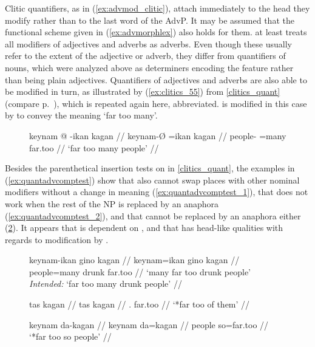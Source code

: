 Clitic quantifiers, as in (\ref{ex:advmod_clitic}), attach immediately to the
head they modify rather than to the last word of the AdvP. It may be assumed
that the functional scheme given in (\ref{ex:advmorphlex}) also holds for them.
\citet{carnie2013} at least treats all modifiers of adjectives and adverbs as
adverbs. Even though these usually refer to the extent of the adjective or
adverb, they differ from quantifiers of nouns, which were analyzed above as
determiners encoding the \Quant{} feature rather than being plain adjectives.
Quantifiers of adjectives and adverbs are also able to be modified in turn, as
illustrated by (\ref{ex:clitics_55}) from \autoref{clitics_quant} (compare
p.~\pageref{ex:clitics_55}), which is repeated again here, abbreviated.
 is modified in this case by
 to convey the meaning `far too many'.

\begin{figure}[h]
\ex\label{ex:clitics_55_short}%
\begingl
	\gla keynam @ -ikan kagan //
	\glb keynam-Ø =ikan kagan //
	\glc people-\Top{} =many far.too //
	\glft `far too many people' //
\endgl
\xe
\end{figure}

Besides the parenthetical insertion tests on  in
\autoref{clitics_quant}, the examples in (\ref{ex:quantadvcomptest}) show that
 also cannot swap places with other nominal modifiers without
a change in meaning (\ref{ex:quantadvcomptest_1}), that  does
not work when the rest of the NP is replaced by an anaphora
(\ref{ex:quantadvcomptest_2}), and that  cannot be replaced
by an anaphora either (\ref{ex:quantadvcomptest_3}). It appears that
 is dependent on , and that
 has head-like qualities with regards to modification by
.

\begin{figure}
\pex\label{ex:quantadvcomptest}
\a\ljudge\excl\label{ex:quantadvcomptest_1}\begingl
	\gla keynam-ikan gino kagan //
	\glb keynam=ikan gino kagan //
	\glc people=many drunk far.too //
	\glft `many far too drunk people'\\
		\textit{Intended:} `far too many drunk people' //
\endgl

\a\ljudge*\label{ex:quantadvcomptest_2}\begingl
	\gla tas kagan //
	\glb tas kagan //
	\glc \TplM{}.\Parg{} far.too //
	\glft `*far too of them' //
\endgl

\a\ljudge*\label{ex:quantadvcomptest_3}\begingl
	\gla keynam da-kagan //
	\glb keynam da=kagan //
	\glc people so=far.too //
	\glft `*far too so people' //
\endgl

\xe
\end{figure}

